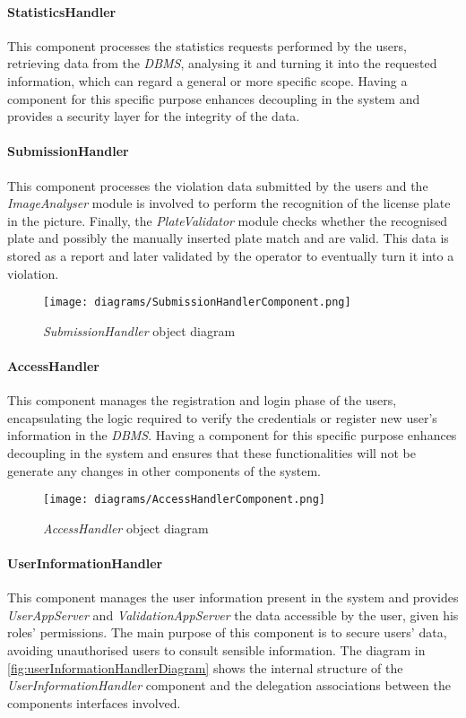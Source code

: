 \paragraph{StatisticsHandler}
This component processes the statistics requests performed by the users, retrieving data from the \textit{DBMS}, analysing it and turning it into the requested information, which can regard a general or more specific scope. Having a component for this specific purpose enhances decoupling in the system and provides a security layer for the integrity of the data.
\clearpage\paragraph{SubmissionHandler}
This component processes the violation data submitted by the users and the \textit{ImageAnalyser} module is involved to perform the recognition of the license plate in the picture. Finally, the \textit{PlateValidator} module checks whether the recognised plate and possibly the manually inserted plate match and are valid. This data is stored as a report and later validated by the operator to eventually turn it into a violation.\newline\newline
\begin{figure}[h!]
	\centering
	\texttt{[image: diagrams/SubmissionHandlerComponent.png]}
	\caption{
		\label{fig:submissionHandlerComponentDiagram} 
		\emph{SubmissionHandler} object diagram
	}
\end{figure}
\paragraph{AccessHandler}
This component manages the registration and login phase of the users, encapsulating the logic required to verify the credentials or register new user's information in the \textit{DBMS}. Having a component for this specific purpose enhances decoupling in the system and ensures that these functionalities will not be generate any changes in other components of the system.\newline\newline
\begin{figure}[h!]
	\centering
	\texttt{[image: diagrams/AccessHandlerComponent.png]}
	\caption{
		\label{fig:accessHandlerComponentDiagram} 
		\emph{AccessHandler} object diagram
	}
\end{figure}
\paragraph{UserInformationHandler}
This component manages the user information present in the system and provides \textit{UserAppServer} and \textit{ValidationAppServer} the data accessible by the user, given his roles' permissions. The main purpose of this component is to secure users' data, avoiding unauthorised users to consult sensible information. The diagram in \autoref{fig:userInformationHandlerDiagram} shows the internal structure of the \textit{UserInformationHandler} component and the delegation associations between the components interfaces involved.
